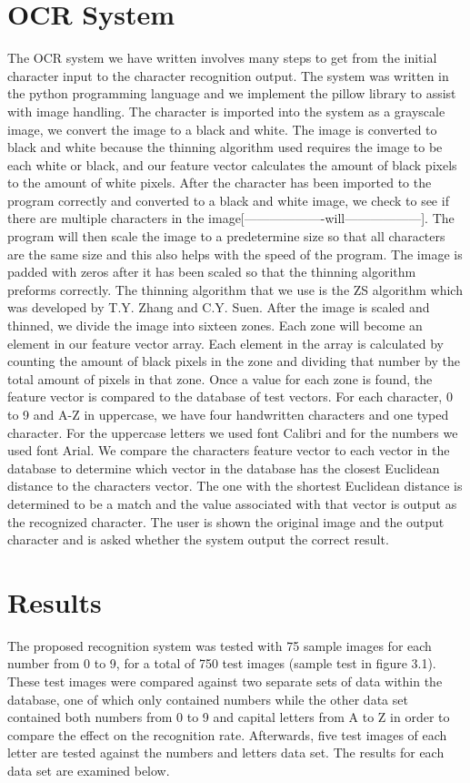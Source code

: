 \documentclass[twocolumn]{article}
\begin{document}
\section{OCR System}
The OCR system we have written involves many steps to get from the initial character input to the character recognition output. The system was written in the python programming language and we implement the pillow library to assist with image handling.  The character is imported into the system as a grayscale image, we convert the image to a black and white.  The image is converted to black and white because the thinning algorithm used requires the image to be each white or black, and our feature vector calculates the amount of black pixels to the amount of white pixels.  After the character has been imported to the program correctly and converted to a black and white image, we check to see if there are multiple characters in the image[-------------------will------------------].  The program will then scale the image to a predetermine size so that all characters are the same size and this also helps with the speed of the program.  The image is padded with zeros after it has been scaled so that the thinning algorithm preforms correctly.  The thinning algorithm that we use is the ZS algorithm which was developed by T.Y. Zhang and C.Y. Suen.  After the image is scaled and thinned, we divide the image into sixteen zones.  Each zone will become an element in our feature vector array.  Each element in the array is calculated by counting the amount of black pixels in the zone and dividing that number by the total amount of pixels in that zone.  Once a value for each zone is found, the feature vector is compared to the database of test vectors.  For each character, 0 to 9 and A-Z in uppercase, we have four handwritten characters and one typed character. For the uppercase letters we used font Calibri and for the numbers we used font Arial.  We compare the characters feature vector to each vector in the database to determine which vector in the database has the closest Euclidean distance to the characters vector.  The one with the shortest Euclidean distance is determined to be a match and the value associated with that vector is output as the recognized character.  The user is shown the original image and the output character and is asked whether the system output the correct result. 
\section{Results}
The proposed recognition system was tested with 75 sample images for each number from 0 to 9, for a total of 750 test images (sample test in figure 3.1). These test images were compared against two separate sets of data within the database, one of which only contained numbers while the other data set contained both numbers from 0 to 9 and capital letters from A to Z in order to compare the effect on the recognition rate. Afterwards, five test images of each letter are tested against the numbers and letters data set. The results for each data set are examined below.
\end{document}
